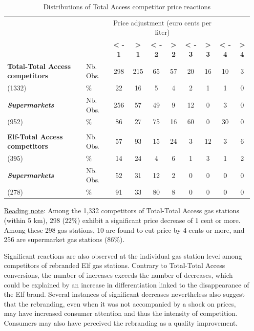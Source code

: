 \documentclass[english]{article}
\begin{document}
\begin{table}
\caption{Distributions of Total Access competitor price reactions}
\label{tab:competitor_price_reactions_stats}
\begin{threeparttable}
\begin{footnotesize}
\begin{tabular}{llcccccccc}
\hline
\hline
{} & {} & \multicolumn{6}{c}{Price adjustment (euro cents per liter)} \tabularnewline
 &  & \textbf{< - 1}  & \textbf{> 1}  & \textbf{< - 2}  & \textbf{> 2}  & \textbf{< - 3}  & \textbf{> 3}  & \textbf{< - 4}  & \textbf{> 4}\tabularnewline
\hline
\textbf{Total-Total Access competitors}  & Nb. Obs.  & 298  & 215  & 65  & 57  & 20  & 16  & 10  & 3\tabularnewline
(1332)  & \%  & 22  & 16  & 5  & 4  & 2  & 1  & 1  & 0\tabularnewline
\textbf{\textit{Supermarkets}}  & Nb. Obs.  & 256  & 57  & 49  & 9  & 12  & 0  & 3  & 0\tabularnewline
(952)  & \%  & 86  & 27  & 75  & 16  & 60  & 0  & 30  & 0\tabularnewline
 &  &  &  &  &  &  &  &  & \tabularnewline
\hline
\textbf{Elf-Total Access competitors}  & Nb. Obs.  & 57  & 93  & 15  & 24  & 3  & 12  & 3  & 6\tabularnewline
(395)  & \%  & 14  & 24  & 4  & 6  & 1  & 3  & 1  & 2\tabularnewline
\textbf{\textit{Supermarkets}}  & Nb. Obs.  & 52  & 31  & 12  & 2  & 0  & 0  & 0  & 0\tabularnewline
(278)  & \%  & 91  & 33  & 80  & 8  & 0  & 0  & 0  & 0\tabularnewline
\hline
\hline
\end{tabular}
\end{footnotesize}
\end{threeparttable}
\parbox{\textwidth}{\footnotesize%
\vspace{2eX} %
{\footnotesize{}\uline{Reading note}}{\footnotesize{}:} Among the 1,332 competitors of Total-Total Access gas stations (within 5 km), 298 (22\%) exhibit a significant price decrease of 1 cent or more. Among these 298 gas stations, 10 are found to cut price by 4 cents or more, and 256 are supermarket gas stations (86\%).}
\end{table}

Significant reactions are also observed at the individual gas station level among competitors of rebranded Elf gas stations. Contrary to Total-Total Access conversions, the number of increases exceeds the number of decreases, which could be explained by an increase in differentiation linked to the disappearance of the Elf brand. Several instances of significant decreases nevertheless also suggest that the rebranding, even when it was not accompanied by a shock on prices, may have increased consumer attention and thus the intensity of competition. Consumers may also have perceived the rebranding as a quality improvement.
\end{document}
